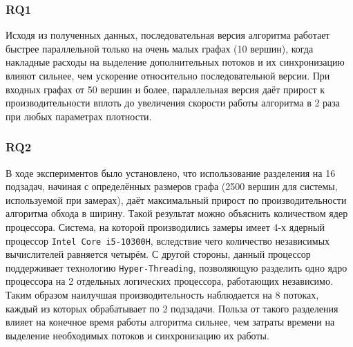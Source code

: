 \subsubsection{RQ1} Исходя из полученных данных, последовательная версия алгоритма работает быстрее параллельной только на очень малых графах (10 вершин), когда накладные расходы на выделение дополнительных потоков и их синхронизацию влияют сильнее, чем ускорение относительно последовательной версии. При входных графах от 50 вершин и более, параллельная версия даёт прирост к производительности вплоть до увеличения скорости работы алгоритма в 2 раза при любых параметрах плотности.
\subsubsection{RQ2} В ходе экспериментов было установлено, что использование разделения на 16 подзадач, начиная с определённых размеров графа (2500 вершин для системы, используемой при замерах), даёт максимальный прирост по производительности алгоритма обхода в ширину. Такой результат можно объяснить количеством ядер процессора. Система, на которой производились замеры имеет 4-х ядерный процессор \texttt{Intel Core i5-10300H}, вследствие чего количество независимых вычислителей равняется четырём. С другой стороны, данный процессор поддерживает технологию \texttt{Hyper-Threading}, позволяющую разделить одно ядро процессора на 2 отдельных логических процессора, работающих независимо. Таким образом наилучшая производительность наблюдается на 8 потоках, каждый из которых обрабатывает по 2 подзадачи. Польза от такого разделения влияет на конечное время работы алгоритма сильнее, чем затраты времени на выделение необходимых потоков и синхронизацию их работы.